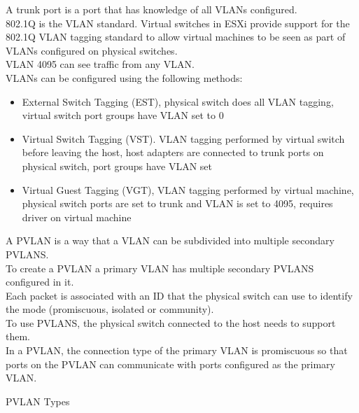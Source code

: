 A trunk port is a port that has knowledge of all VLANs configured.\\

802.1Q is the VLAN standard. Virtual switches in ESXi provide support for the
802.1Q VLAN tagging standard to allow virtual machines to be seen as part of
VLANs configured on physical switches.\\

VLAN 4095 can see traffic from any VLAN.\\

VLANs can be configured using the following methods:

\begin{itemize}

\item External Switch Tagging (EST), physical switch does all VLAN tagging,
virtual switch port groups have VLAN set to 0

\item Virtual Switch Tagging (VST). VLAN tagging performed by virtual switch
before leaving the host, host adapters are connected to trunk ports on
physical switch, port groups have VLAN set

\item Virtual Guest Tagging (VGT), VLAN tagging performed by virtual machine,
physical switch ports are set to trunk and VLAN is set to 4095, requires
driver on virtual machine

\end{itemize}

A PVLAN is a way that a VLAN can be subdivided into multiple secondary PVLANS.\\

To create a PVLAN a primary VLAN has multiple secondary PVLANS configured in
it.\\

Each packet is associated with an ID that the physical switch can use to
identify the mode (promiscuous, isolated or community).\\

To use PVLANS, the physical switch connected to the host needs to support them.\\

In a PVLAN, the connection type of the primary VLAN is promiscuous so that
ports on the PVLAN can communicate with ports configured as the primary VLAN.

PVLAN Types

